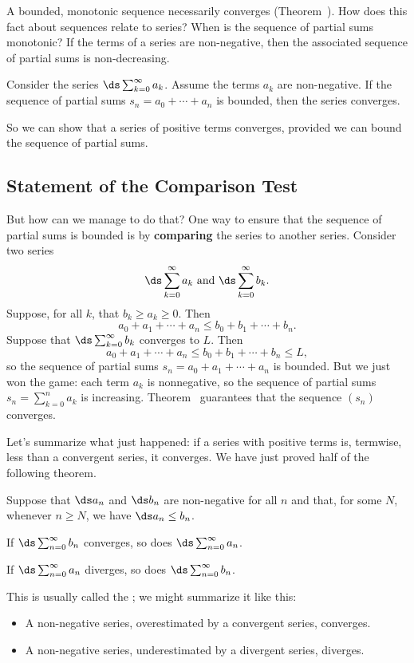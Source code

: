 \nobreak A bounded, monotonic sequence necessarily converges
(Theorem~).  How does this fact about
sequences relate to series?  When is the sequence of partial sums
monotonic?  If the terms of a series are non-negative, then the
associated sequence of partial sums is non-decreasing.
\begin{corollary}
  Consider the series $\ds\sum_{k=0}^\infty a_k$.  Assume the terms
  $a_k$ are non-negative.  If the sequence of partial sums $s_n = a_0
  + \cdots + a_n$ is bounded, then the series converges.
\end{corollary}
So we can show that a series of positive terms converges, provided we
can bound the sequence of partial sums.  

\subsection{Statement of the Comparison Test}

But how can we manage to do that?  One way to ensure that the sequence
of partial sums is bounded is by \textbf{comparing} the series to
another series.  Consider two series
$$
\ds\sum_{k=0}^\infty a_k \mbox{ and }
\ds\sum_{k=0}^\infty b_k.
$$
Suppose, for all $k$, that $b_k \geq a_k \geq 0$.  Then
$$
a_0 + a_1 + \cdots + a_n \leq b_0 + b_1 + \cdots + b_n.
$$
Suppose that $\ds\sum_{k=0}^\infty b_k$ converges to $L$.  Then
$$
a_0 + a_1 + \cdots + a_n \leq b_0 + b_1 + \cdots + b_n \leq L,
$$
so the sequence of partial sums $s_n = a_0 + a_1 + \cdots + a_n$ is
bounded.  But we just won the game: each term $a_k$ is nonnegative, so
the sequence of partial sums $s_n = \sum_{k=0}^n a_k$ is increasing.
Theorem~ guarantees that the sequence
$(s_n)$ converges.

Let's summarize what just happened: if a series with positive terms
is, termwise, less than a convergent series, it converges.  We have
just proved half of the following theorem.
\begin{theorem}\label{thm:comparison-test}
Suppose that $\ds a_n$ and $\ds b_n$ are non-negative for all $n$ and
that, for some $N$, whenever $n \geq N$, we have $\ds a_n \leq b_n$.

If $\ds\sum_{n=0}^\infty b_n$ converges, so does $\ds\sum_{n=0}^\infty a_n$.

If $\ds\sum_{n=0}^\infty a_n$ diverges, so does $\ds\sum_{n=0}^\infty b_n$.
\end{theorem}
This is usually called the ; we might summarize it like this:
\begin{itemize}
\item A non-negative series, overestimated by a convergent series, converges.
\item A non-negative series, underestimated by a divergent series, diverges.
\end{itemize}

